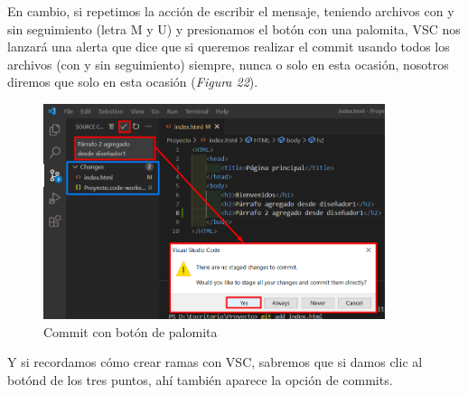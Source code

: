En cambio, si repetimos la acción de escribir el mensaje, teniendo archivos con y sin seguimiento (letra M y U) y presionamos el botón con una palomita, VSC nos lanzará una alerta que dice que si queremos realizar el commit usando todos los archivos (con y sin seguimiento) siempre, nunca o solo en esta ocasión, nosotros diremos que solo en esta ocasión (\textit{Figura 22}).
\begin{figure}[H]
    \begin{center}
        \caption{Commit con botón de palomita}
        \label{fig: 22}
        \includegraphics[width=10cm]{capturas/commits2.png}
    \end{center}
\end{figure}

Y si recordamos cómo crear ramas con VSC, sabremos que si damos clic al botónd de los tres puntos, ahí también aparece la opción de commits.

